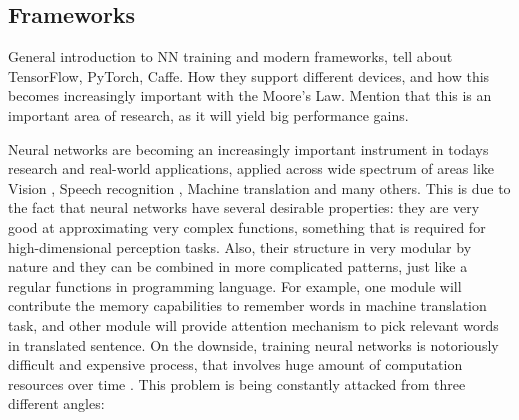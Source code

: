 \subsection{Frameworks}

General introduction to NN training and modern frameworks, tell about
TensorFlow, PyTorch, Caffe. How they support different devices, and how
this becomes increasingly important with the Moore's Law. Mention that this
is an important area of research, as it will yield big performance gains.

Neural networks are becoming an increasingly important instrument in todays research and
real-world applications, applied across wide spectrum of areas like Vision \cite{ImageNet},
Speech recognition \cite{Baidu}, Machine translation \cite{GoogleNMT} and many others.
This is due to the fact that neural networks have several desirable properties: they are very
good at approximating very complex functions, something that is required for high-dimensional
perception tasks. Also, their structure in very modular by nature and they can be combined in
more complicated patterns, just like a regular functions in programming language. For example,
one module will contribute the memory capabilities to remember words in machine translation
task, and other module will provide attention mechanism to pick relevant words in translated
sentence.
On the downside, training neural networks is notoriously difficult and expensive process,
that involves huge amount of computation resources over time \cite{LongTraining}.
This problem is being constantly attacked from three different angles:
